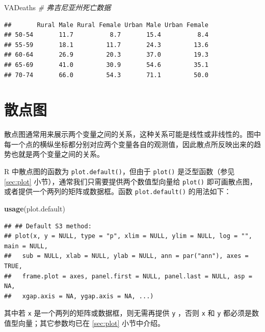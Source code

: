 \documentclass[
  b5paper,
  UTF8,twoside]{book}
\newenvironment{Shaded}{\begin{snugshade}}{\end{snugshade}}
\newcommand{\CommentTok}[1]{\textcolor[rgb]{0.56,0.35,0.01}{\textit{#1}}}
\newcommand{\FunctionTok}[1]{\textcolor[rgb]{0.13,0.29,0.53}{\textbf{#1}}}
\newcommand{\NormalTok}[1]{#1}
\begin{document}
\begin{Shaded}
\begin{Highlighting}[]
\NormalTok{VADeaths }\CommentTok{\# 弗吉尼亚州死亡数据}
\end{Highlighting}
\end{Shaded}

\begin{verbatim}
##       Rural Male Rural Female Urban Male Urban Female
## 50-54       11.7          8.7       15.4          8.4
## 55-59       18.1         11.7       24.3         13.6
## 60-64       26.9         20.3       37.0         19.3
## 65-69       41.0         30.9       54.6         35.1
## 70-74       66.0         54.3       71.1         50.0
\end{verbatim}

\section{散点图}\label{sec:plot-default}

散点图通常用来展示两个变量之间的关系，这种关系可能是线性或非线性的。图中每一个点的横纵坐标都分别对应两个变量各自的观测值，因此散点所反映出来的趋势也就是两个变量之间的关系。

R 中散点图的函数为 \texttt{plot.default()}，但由于 \texttt{plot()} 是泛型函数（参见 \ref{sec:plot} 小节），通常我们只需要提供两个数值型向量给 \texttt{plot()} 即可画散点图，或者提供一个两列的矩阵或数据框。函数 \texttt{plot.default()} 的用法如下：

\begin{Shaded}
\begin{Highlighting}[]
\FunctionTok{usage}\NormalTok{(plot.default)}
\end{Highlighting}
\end{Shaded}

\begin{verbatim}
## ## Default S3 method:
## plot(x, y = NULL, type = "p", xlim = NULL, ylim = NULL, log = "", main = NULL,
##   sub = NULL, xlab = NULL, ylab = NULL, ann = par("ann"), axes = TRUE,
##   frame.plot = axes, panel.first = NULL, panel.last = NULL, asp = NA,
##   xgap.axis = NA, ygap.axis = NA, ...)
\end{verbatim}

其中若 \texttt{x} 是一个两列的矩阵或数据框，则无需再提供 \texttt{y} ，否则 \texttt{x} 和 \texttt{y} 都必须是数值型向量；其它参数均已在 \ref{sec:plot} 小节中介绍。
\end{document}
